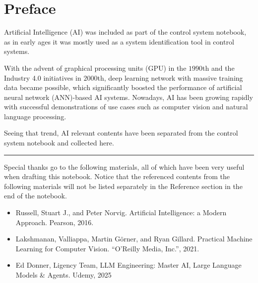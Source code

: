 \chapter*{Preface}

Artificial Intelligence (AI) was included as part of the control system notebook, as in early ages it was mostly used as a system identification tool in control systems.

With the advent of graphical processing units (GPU) in the $1990$th and the Industry 4.0 initiatives in $2000$th, deep learning network with massive training data became possible, which significantly boosted the performance of artificial neural network (ANN)-based AI systems. Nowadays, AI has been growing rapidly with successful demonstrations of use cases such as computer vision and natural language processing.

Seeing that trend, AI relevant contents have been separated from the control system notebook and collected here. 

\vspace{0.1in}
\noindent \rule{1in}{0.4pt}
\vspace{0.1in}

Special thanks go to the following materials, all of which have been very useful when drafting this notebook. Notice that the referenced contents from the following materials will not be listed separately in the Reference section in the end of the notebook.
\begin{itemize}
  \item Russell, Stuart J., and Peter Norvig. Artificial Intelligence: a Modern Approach. Pearson, 2016.
  \item Lakshmanan, Valliappa, Martin G\"orner, and Ryan Gillard. Practical Machine Learning for Computer Vision. ``O'Reilly Media, Inc.'', 2021. 
  \item Ed Donner, Ligency Team, LLM Engineering: Master AI, Large Language Models \& Agents. Udemy, 2025
\end{itemize} 